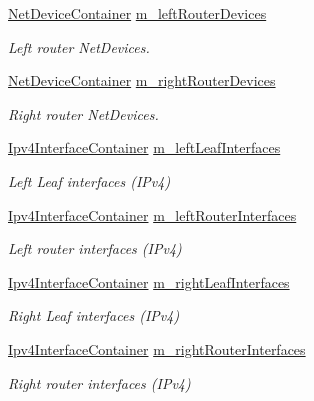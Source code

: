 \begin{DoxyCompactItemize}
\hyperlink{classns3_1_1NetDeviceContainer}{Net\+Device\+Container} \hyperlink{classns3_1_1PointToPointDumbbellHelper_a1682bfa450a792e7c77ed48fa55ab34c}{m\+\_\+left\+Router\+Devices}
\begin{DoxyCompactList}\small\item\em Left router Net\+Devices. \end{DoxyCompactList}\item 
\hyperlink{classns3_1_1NetDeviceContainer}{Net\+Device\+Container} \hyperlink{classns3_1_1PointToPointDumbbellHelper_a608a09eafcac83b1c2700503e2e63437}{m\+\_\+right\+Router\+Devices}
\begin{DoxyCompactList}\small\item\em Right router Net\+Devices. \end{DoxyCompactList}\item 
\hyperlink{classns3_1_1Ipv4InterfaceContainer}{Ipv4\+Interface\+Container} \hyperlink{classns3_1_1PointToPointDumbbellHelper_af6a3433023853f4378ed193bbf6cd458}{m\+\_\+left\+Leaf\+Interfaces}
\begin{DoxyCompactList}\small\item\em Left Leaf interfaces (I\+Pv4) \end{DoxyCompactList}\item 
\hyperlink{classns3_1_1Ipv4InterfaceContainer}{Ipv4\+Interface\+Container} \hyperlink{classns3_1_1PointToPointDumbbellHelper_a745c1f7a12b6b6b40ce89554f09cd4f8}{m\+\_\+left\+Router\+Interfaces}
\begin{DoxyCompactList}\small\item\em Left router interfaces (I\+Pv4) \end{DoxyCompactList}\item 
\hyperlink{classns3_1_1Ipv4InterfaceContainer}{Ipv4\+Interface\+Container} \hyperlink{classns3_1_1PointToPointDumbbellHelper_ad5af3eae62a06c2468fe7f4ec1793b1a}{m\+\_\+right\+Leaf\+Interfaces}
\begin{DoxyCompactList}\small\item\em Right Leaf interfaces (I\+Pv4) \end{DoxyCompactList}\item 
\hyperlink{classns3_1_1Ipv4InterfaceContainer}{Ipv4\+Interface\+Container} \hyperlink{classns3_1_1PointToPointDumbbellHelper_a0cf1c243ef7d8afd3a2c93c80765e94c}{m\+\_\+right\+Router\+Interfaces}
\begin{DoxyCompactList}\small\item\em Right router interfaces (I\+Pv4) \end{DoxyCompactList}\item 

\end{DoxyCompactItemize}
